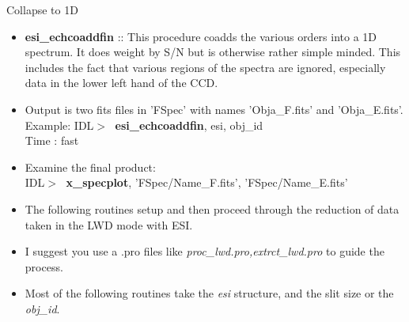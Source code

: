 \documentclass[11pt,letterpaper,dvips]{article}
\begin{document}
\begin{enumerate}
{\Large  \item Collapse to 1D}
  \begin{itemize}
	\item {\bf esi\_echcoaddfin} ::
	This procedure coadds the various orders into a 1D spectrum.  It does
	weight by S/N but is otherwise rather simple minded.  This includes the
	fact that various regions of the spectra are ignored, especially data
	in the lower left hand of the CCD. 
	\item Output is two fits files in 'FSpec' with names 'Obja\_F.fits' and
	'Obja\_E.fits'.
         \quad Example: IDL$> \;$ {\bf esi\_echcoaddfin}, esi, obj\_id \\
         \quad Time   : fast \\
	\item Examine the final product: \\
         \quad IDL$> \;$ {\bf x\_specplot}, 'FSpec/Name\_F.fits', 
		'FSpec/Name\_E.fits'
  \end{itemize}

\end{enumerate}

\clearpage


  \begin{itemize}
	\item The following routines setup and then proceed through the
	reduction of data taken in the LWD mode with ESI.
	\item I suggest you use a .pro files like 
	{\it proc\_lwd.pro,extrct\_lwd.pro} 
	to guide the process.  
	\item Most of the following routines take the {\it esi} structure,
	and the slit size or the {\it obj\_id}.
  \end{itemize}
\end{document}
